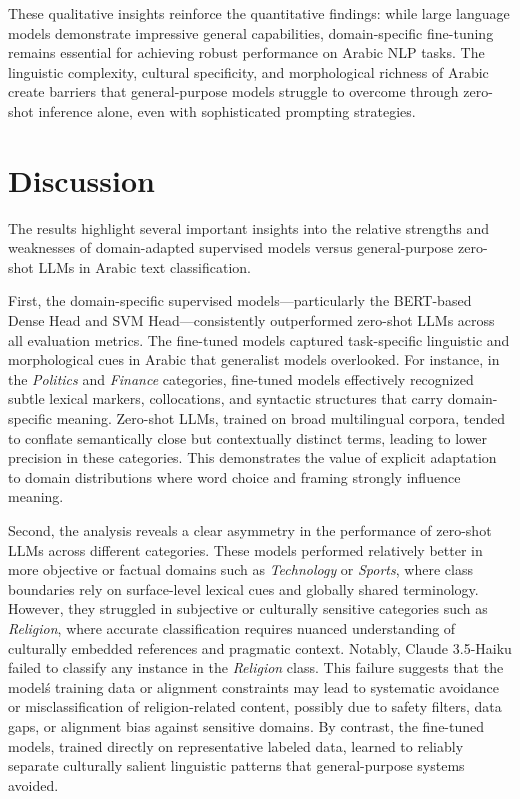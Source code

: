 \documentclass[preprint,12pt,authoryear]{elsarticle}
\begin{document}
These qualitative insights reinforce the quantitative findings: while large language models demonstrate impressive general capabilities, domain-specific fine-tuning remains essential for achieving robust performance on Arabic NLP tasks. The linguistic complexity, cultural specificity, and morphological richness of Arabic create barriers that general-purpose models struggle to overcome through zero-shot inference alone, even with sophisticated prompting strategies.

\section{Discussion}
\label{discussion}

The results highlight several important insights into the relative strengths and weaknesses of domain-adapted supervised models versus general-purpose zero-shot LLMs in Arabic text classification.

First, the domain-specific supervised models---particularly the BERT-based Dense Head and SVM Head---consistently outperformed zero-shot LLMs across all evaluation metrics. The fine-tuned models captured task-specific linguistic and morphological cues in Arabic that generalist models overlooked. For instance, in the \textit{Politics} and \textit{Finance} categories, fine-tuned models effectively recognized subtle lexical markers, collocations, and syntactic structures that carry domain-specific meaning. Zero-shot LLMs, trained on broad multilingual corpora, tended to conflate semantically close but contextually distinct terms, leading to lower precision in these categories. This demonstrates the value of explicit adaptation to domain distributions where word choice and framing strongly influence meaning.

Second, the analysis reveals a clear asymmetry in the performance of zero-shot LLMs across different categories. These models performed relatively better in more objective or factual domains such as \textit{Technology} or \textit{Sports}, where class boundaries rely on surface-level lexical cues and globally shared terminology. However, they struggled in subjective or culturally sensitive categories such as \textit{Religion}, where accurate classification requires nuanced understanding of culturally embedded references and pragmatic context. Notably, Claude 3.5-Haiku failed to classify any instance in the \textit{Religion} class. This failure suggests that the model\'s training data or alignment constraints may lead to systematic avoidance or misclassification of religion-related content, possibly due to safety filters, data gaps, or alignment bias against sensitive domains. By contrast, the fine-tuned models, trained directly on representative labeled data, learned to reliably separate culturally salient linguistic patterns that general-purpose systems avoided.
\end{document}
